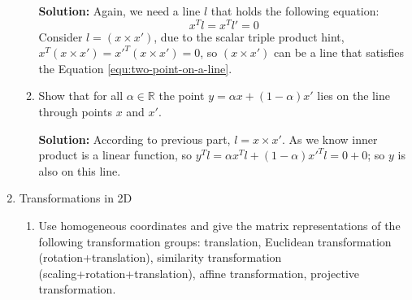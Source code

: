 \documentclass[12pt]{article}
\begin{document}
\begin{enumerate}[leftmargin=\labelsep]
\begin{enumerate}
    \textbf{Solution:}
    Again, we need a line $l$ that holds the following equation:
    \begin{equation}\label{equ:two-point-on-a-line}
        x^Tl = x^Tl' = 0
    \end{equation}
    Consider $l = (x \times x')$, due to the scalar triple product hint, $x^T(x\times x') = x'^T(x\times x') = 0 $, so $(x \times x')$ can be a line that satisfies the Equation \ref{equ:two-point-on-a-line}.
    \item  Show that for all $\alpha \in \mathbb{R}$ the point $y = \alpha x + (1 - \alpha)x'$ lies on the line through points $x$ and $x'$.
    
    \textbf{Solution:} According to previous part, $l = x \times x'$. As we know inner product is a linear function, so $y^T l = \alpha x^Tl + (1-\alpha) x'^Tl = 0 + 0$; so $y$ is also on this line.
    \end{enumerate}

\item  Transformations in 2D
    \begin{enumerate}
    \item  Use homogeneous coordinates and give the matrix representations of the following transformation groups: translation, Euclidean transformation (rotation+translation), similarity transformation (scaling+rotation+translation), affine transformation, projective transformation.
    

\end{enumerate}
\end{enumerate}
\end{document}
